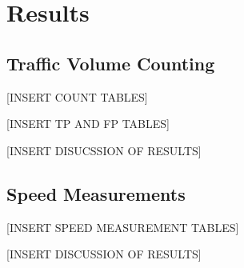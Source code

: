\chapter{Results}

\section{Traffic Volume Counting}


[INSERT COUNT TABLES]


[INSERT TP AND FP TABLES]

[INSERT DISUCSSION OF RESULTS]

\section{Speed Measurements}

[INSERT SPEED MEASUREMENT TABLES]

[INSERT DISCUSSION OF RESULTS]

